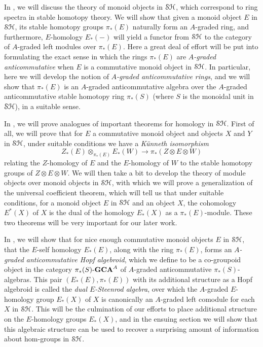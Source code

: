 \documentclass[../main.tex]{subfiles}
\begin{document}
In , we will discuss the theory of monoid objects in $\mathcal{SH}$, which correspond to ring spectra in stable homotopy theory. We will show that given a monoid object $E$ in $\mathcal{SH}$, its stable homotopy groups $\pi_*(E)$ naturally form an $A$-graded ring, and furthermore, $E$-homology $E_*(-)$ will yield a functor from $\mathcal{SH}$ to the category of $A$-graded left modules over $\pi_*(E)$. Here a great deal of effort will be put into formulating the exact sense in which the rings $\pi_*(E)$ are \emph{$A$-graded anticommutative} when $E$ is a commutative monoid object in $\mathcal{SH}$. In particular, here we will develop the notion of \emph{$A$-graded anticommutative rings}, and we will show that $\pi_*(E)$ is an $A$-graded anticommutative algebra over the $A$-graded anticommutative stable homotopy ring $\pi_*(S)$ (where $S$ is the monoidal unit in $\mathcal{SH}$), in a suitable sense.

In , we will prove analogues of important theorems for homology in $\mathcal{SH}$. First of all, we will prove that for $E$ a commutative monoid object and objects $X$ and $Y$ in $\mathcal{SH}$, under suitable conditions we have a \emph{K\"unneth isomorphism}
\[Z_*(E)\otimes_{\pi_*(E)}E_*(W)\to\pi_*(Z\otimes E\otimes W)\]
relating the $Z$-homology of $E$ and the $E$-homology of $W$ to the stable homotopy groups of $Z\otimes E\otimes W$. We will then take a bit to develop the theory of module objects over monoid objects in $\mathcal{SH}$, with which we will prove a generalization of the universal coefficient theorem, which will tell us that under suitable conditions, for a monoid object $E$ in $\mathcal{SH}$ and an object $X$, the cohomology $E^*(X)$ of $X$ is the dual of the homology $E_*(X)$ as a $\pi_*(E)$-module. These two theorems will be very important for our later work.

In , we will show that for nice enough commutative monoid objects $E$ in $\mathcal{SH}$, that the $E$-self homology $E_*(E)$, along with the ring $\pi_*(E)$, forms an \emph{$A$-graded anticommutative Hopf algebroid}, which we define to be a co-groupoid object in the category $\pi_*(S)\text-\mathbf{GCA}^A$ of $A$-graded anticommutative $\pi_*(S)$-algebras. This pair $(E_*(E),\pi_*(E))$ with its additional structure as a Hopf algebroid is called the \emph{dual $E$-Steenrod algebra}, over which the $A$-graded $E$-homology group $E_*(X)$ of $X$ is canonically an $A$-graded left comodule for each $X$ in $\mathcal{SH}$. This will be the culmination of our efforts to place additional structure on the $E$-homology groups $E_*(X)$, and in the ensuing section we will show that this algebraic structure can be used to recover a surprising amount of information about hom-groups in $\mathcal{SH}$.
\end{document}
